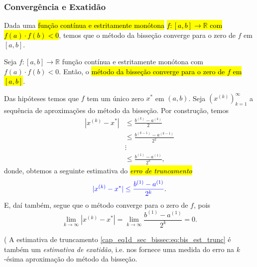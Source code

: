 \subsubsection{Convergência e Exatidão}

Dada uma \hl{função contínua e estritamente monótona} \hl{$f:[a, b]\to\mathbb{R}$ com $f(a)\cdot f(b) < 0$}, temos que o método da bisseção converge para o zero de $f$ em $[a, b]$.

\begin{teo}\label{cap_eq1d_sec_bissec:teo:bissece}
  Seja $f:[a, b]\to\mathbb{R}$ função contínua e estritamente monótona com $f(a)\cdot f(b) < 0$. Então, o \hl{método da bisseção converge para o zero de $f$ em $[a, b]$}.
\end{teo}
\begin{dem}
  Das hipóteses temos que $f$ tem um único zero $x^*$ em $(a, b)$. Seja $(x^{(k)})_{k=1}^\infty$ a sequência de aproximações do método da bisseção. Por construção, temos
  \begin{align}
    |x^{(k)} - x^{*}| &\leq \frac{b^{(k)}-a^{(k)}}{2}\\
                      &\leq \frac{b^{(k-1)}-a^{(k-1)}}{2^2}\\
                      &\vdots \\
                      &\leq \frac{b^{(1)}-a^{(1)}}{2^k},
  \end{align}
  donde, obtemos a seguinte estimativa do \hl{\emph{erro de truncamento}}
  \begin{equation}\label{cap_eq1d_sec_bissec:eq:bis_est_trunc}
    {\color{blue}|x^{(k)} - x^{*}| \leq \frac{b^{(1)}-a^{(1)}}{2^k}}.
  \end{equation}
  E, daí também, segue que o método converge para o zero de $f$, pois
  \begin{equation}
    \lim_{k\to\infty} |x^{(k)}-x^{*}| = \lim_{k\to\infty} \frac{b^{(1)}-a^{(1)}}{2^k} = 0.
  \end{equation}
\end{dem}

\begin{obs}(
  A estimativa de truncamento \ref{cap_eq1d_sec_bissec:eq:bis_est_trunc} é também um \emph{estimativa de exatidão}, i.e. nos fornece uma medida do erro na $k$-ésima aproximação do método da bisseção.
\end{obs}

